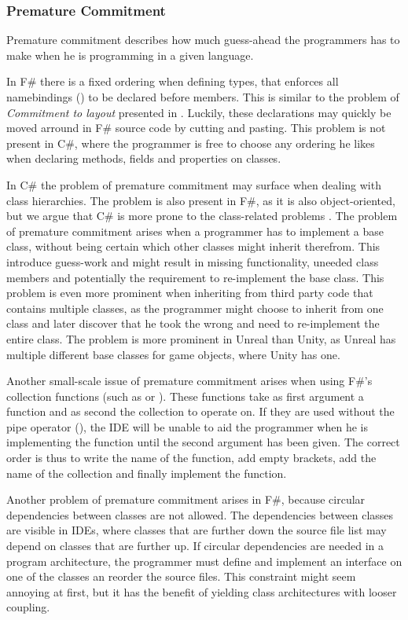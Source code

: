 \subsubsection{Premature Commitment}
Premature commitment describes how much guess-ahead the programmers has to make when he is programming in a given language. 

In F\# there is a fixed ordering when defining types, that enforces all namebindings () to be declared before members. This is similar to the problem of \textit{Commitment to layout} presented in \cite{green1996usability}. Luckily, these declarations may quickly be moved arround in F\# source code by cutting and pasting. This problem is not present in C\#, where the programmer is free to choose any ordering he likes when declaring methods, fields and properties on classes.

In C\# the problem of premature commitment may surface when dealing with class hierarchies. The problem is also present in F\#, as it is also object-oriented, but we argue that C\# is more prone to the class-related problems . The problem of premature commitment arises when a programmer has to implement a base class, without being certain which other classes might inherit therefrom. This introduce guess-work and might result in missing functionality, uneeded class members and potentially the requirement to re-implement the base class. This problem is even more prominent when inheriting from third party code that contains multiple classes, as the programmer might choose to inherit from one class and later discover that he took the wrong and need to re-implement the entire class. The problem is more prominent in Unreal than Unity, as Unreal has multiple different base classes for game objects\needcite, where Unity has one.

Another small-scale issue of premature commitment arises when using F\#'s collection functions (such as  or ). These functions take as first argument a function and as second the collection to operate on. If they are used without the pipe operator (\ttt{|\textgreater}), the \gls{IDE} will be unable to aid the programmer when he is implementing the function until the second argument has been given. The correct order is thus to write the name of the function, add empty brackets, add the name of the collection and finally implement the function.

Another problem of premature commitment arises in F\#, because circular dependencies between classes are not allowed. The dependencies between classes are visible in \glspl{IDE}, where classes that are further down the source file list may depend on classes that are further up. If circular dependencies are needed in a program architecture, the programmer must define and implement an interface on one of the classes an reorder the source files. This constraint might seem annoying at first, but it has the benefit of yielding class architectures with looser coupling\cite{interfaces:and:coupling}. 